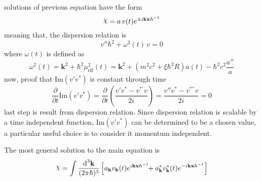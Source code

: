 \documentclass[pt=11, openany,twoside,a4paper]{scrbook}
\DeclareRobustCommand{\rchi}{{\mathpalette\irchi\relax}}
\newcommand{\irchi}[2]{\raisebox{\depth}{$#1\chi$}} %
\begin{document}
	solutions of previous equation have the form
	\begin{equation}
		\rchi=a\,v(t)e^{\pm i\mathbf{kx}\hbar^{-1}}
	\end{equation}
	meaning that, the dispersion relation is
	\begin{equation}
		v''\hbar^2+\omega^2(t)\,v=0
	\end{equation}
	where $\omega(t)$ is defined as
	\begin{equation}
		\omega^2(t)=\mathbf{k}^2+\hbar^2\mu_{\text{eff}}^2(t)=\mathbf{k}^2+\left(m^2c^2+\xi\hbar^2 R\right)a(t)-\hbar^2c^2\frac{a''}{a}
	\end{equation}
	now, proof that Im$(v'v^*)$ is constant through time
	\begin{equation}
		\frac{\partial}{\partial t}\text{Im}(v'v^*)=\frac{\partial}{\partial t}\left(\frac{v'v^*-v^{*'}v}{2i}\right)=\frac{v''v^*-v^{*''}v}{2i}=0
	\end{equation}
	last step is result from dispersion relation. Since dispersion relation is scalable by a time independent function, Im$(v'v^*)$ can be determined to be a chosen value, a particular useful choice is to consider it momentum independent.
	
	
	
	The most general solution to the main equation is
	\begin{equation}
		\rchi=\int\frac{\td^3\mathbf{k}}{(2\pi\hbar)^3}\left[a_\mathbf{k}v_\mathbf{k}(t)e^{i\mathbf{kx}\hbar^{-1}}\!\!+a_\mathbf{k}^*v_\mathbf{k}^*(t)e^{-i\mathbf{kx}\hbar^{-1}}\right]
	\end{equation}
	
\end{document}
